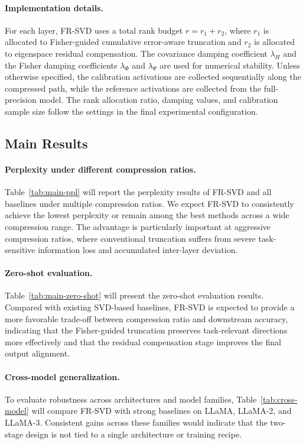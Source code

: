 \documentclass[a4paper,fleqn]{cas-dc}
\begin{document}
\paragraph{Implementation details.}
For each layer, FR-SVD uses a total rank budget $r = r_1 + r_2$, where $r_1$ is allocated to Fisher-guided cumulative error-aware truncation and $r_2$ is allocated to eigenspace residual compensation. The covariance damping coefficient $\lambda_H$ and the Fisher damping coefficients $\lambda_\Phi$ and $\lambda_\Psi$ are used for numerical stability. Unless otherwise specified, the calibration activations are collected sequentially along the compressed path, while the reference activations are collected from the full-precision model. The rank allocation ratio, damping values, and calibration sample size follow the settings in the final experimental configuration.

\subsection{Main Results}

\paragraph{Perplexity under different compression ratios.}
Table~\ref{tab:main-ppl} will report the perplexity results of FR-SVD and all baselines under multiple compression ratios. We expect FR-SVD to consistently achieve the lowest perplexity or remain among the best methods across a wide compression range. The advantage is particularly important at aggressive compression ratios, where conventional truncation suffers from severe task-sensitive information loss and accumulated inter-layer deviation.

\paragraph{Zero-shot evaluation.}
Table~\ref{tab:main-zero-shot} will present the zero-shot evaluation results. Compared with existing SVD-based baselines, FR-SVD is expected to provide a more favorable trade-off between compression ratio and downstream accuracy, indicating that the Fisher-guided truncation preserves task-relevant directions more effectively and that the residual compensation stage improves the final output alignment.

\paragraph{Cross-model generalization.}
To evaluate robustness across architectures and model families, Table~\ref{tab:cross-model} will compare FR-SVD with strong baselines on LLaMA, LLaMA-2, and LLaMA-3. Consistent gains across these families would indicate that the two-stage design is not tied to a single architecture or training recipe.
\end{document}
